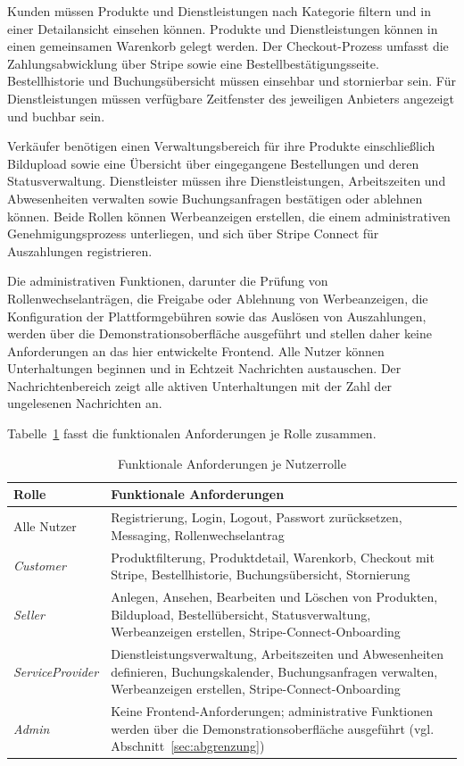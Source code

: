 Kunden müssen Produkte und Dienstleistungen nach Kategorie
filtern und in einer Detailansicht einsehen können. Produkte
und Dienstleistungen können in einen gemeinsamen Warenkorb
gelegt werden. Der Checkout-Prozess umfasst die
Zahlungsabwicklung über Stripe sowie eine
Bestellbestätigungsseite. Bestellhistorie und
Buchungsübersicht müssen einsehbar und stornierbar sein.
Für Dienstleistungen müssen verfügbare Zeitfenster des
jeweiligen Anbieters angezeigt und buchbar sein.

Verkäufer benötigen einen Verwaltungsbereich für ihre Produkte einschließlich Bildupload sowie eine Übersicht
über eingegangene Bestellungen und deren Statusverwaltung.
Dienstleister müssen ihre Dienstleistungen, Arbeitszeiten
und Abwesenheiten verwalten sowie Buchungsanfragen
bestätigen oder ablehnen können. Beide Rollen können
Werbeanzeigen erstellen, die einem administrativen
Genehmigungsprozess unterliegen, und sich über
Stripe Connect für Auszahlungen registrieren.

Die administrativen Funktionen, darunter die Prüfung von
Rollenwechselanträgen, die Freigabe oder Ablehnung von
Werbeanzeigen, die Konfiguration der Plattformgebühren sowie
das Auslösen von Auszahlungen, werden über die Demonstrationsoberfläche
ausgeführt und stellen daher
keine Anforderungen an das hier entwickelte Frontend. Alle Nutzer können Unterhaltungen beginnen und in Echtzeit Nachrichten
austauschen. Der Nachrichtenbereich zeigt alle aktiven Unterhaltungen
mit der Zahl der ungelesenen Nachrichten an.

Tabelle~\ref{tab:funktionale-anforderungen} fasst die
funktionalen Anforderungen je Rolle zusammen.

\begin{table}[htbp]
\centering
\caption{Funktionale Anforderungen je Nutzerrolle}
\label{tab:funktionale-anforderungen}
\begin{tabular}{|p{3cm}|p{9.5cm}|}
\hline
\textbf{Rolle} & \textbf{Funktionale Anforderungen} \\
\hline
Alle Nutzer & Registrierung, Login, Logout,
Passwort zurücksetzen, Messaging, Rollenwechselantrag \\
\hline
\textit{Customer} & Produktfilterung, Produktdetail,
Warenkorb, Checkout mit Stripe, Bestellhistorie,
Buchungsübersicht, Stornierung \\
\hline
\textit{Seller} & Anlegen, Ansehen, Bearbeiten und Löschen von Produkten,
Bildupload, Bestellübersicht, Statusverwaltung, Werbeanzeigen
erstellen, Stripe-Connect-Onboarding \\
\hline
\textit{ServiceProvider} & Dienstleistungsverwaltung, Arbeitszeiten
und Abwesenheiten definieren, Buchungskalender,
Buchungsanfragen verwalten, Werbeanzeigen erstellen,
Stripe-Connect-Onboarding \\
\hline
\textit{Admin} & Keine Frontend-Anforderungen; administrative Funktionen werden über die Demonstrationsoberfläche ausgeführt (vgl. Abschnitt~\ref{sec:abgrenzung}) \\
\hline
\end{tabular}
\end{table}

